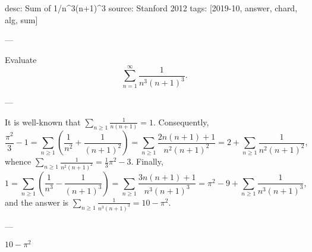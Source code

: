 desc: Sum of 1/n^3(n+1)^3
source: Stanford 2012
tags: [2019-10, answer, chard, alg, sum]

---

Evaluate \[\sum_{n=1}^\infty\frac1{n^3(n+1)^3}.\]

---

It is well-known that $\sum_{n\ge1}\frac1{n(n+1)}=1$. Consequently, \[\frac{\pi^2}3-1=\sum_{n\ge1}\left(\frac1{n^2}+\frac1{(n+1)^2}\right)=\sum_{n\ge1}\frac{2n(n+1)+1}{n^2(n+1)^2}=2+\sum_{n\ge1}\frac1{n^2(n+1)^2},\]
whence $\sum_{n\ge1}\frac1{n^2(n+1)^2}=\frac13\pi^2-3$. Finally, \[1=\sum_{n\ge1}\left(\frac1{n^3}-\frac1{(n+1)^3}\right)=\sum_{n\ge1}\frac{3n(n+1)+1}{n^3(n+1)^3}=\pi^2-9+\sum_{n\ge1}\frac1{n^3(n+1)^3},\]
and the answer is $\sum_{n\ge1}\frac1{n^3(n+1)^3}=10-\pi^2$.

---

$10-\pi^2$
